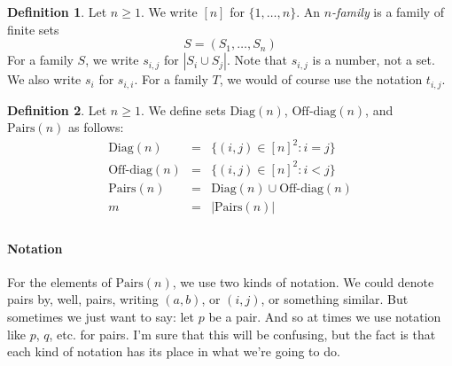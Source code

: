\documentclass[12pt]{article}
\theoremstyle{definition}
\newtheorem{definition}{Definition}
\newcommand{\set}[1]{\{ #1 \}}
\begin{document}
\newcommand{\Diag}{\mbox{Diag}}
\newcommand{\OffDiag}{\mbox{Off-diag}}
\newcommand{\Pairs}{\mbox{Pairs}}
\newcommand{\Bad}{\mbox{Bad}}
\newcommand{\argmax}{\mbox{argmax}}
\newcommand{\Clamp}{\mbox{Clamp}}
\newcommand{\sClamp}{\mbox{subset-Clamp}}
\newcommand{\ordercanonical}{<_{\scriptstyle can}}
\newcommand{\lex}{\ordercanonical}
\newcommand{\lexcanonical}{\ordercanonical}
\newcommand{\precsubseteq}{\preceq_{\scriptsize subset}}
\newcommand{\approxsubset}{\approx_{\scriptsize subset}}


\begin{definition}
Let $n\geq 1$.   We write $[n]$ for $\set{1,\ldots, n}$.
An \emph{$n$-family} is  a family of  finite sets
\[ S = (S_1, \ldots, S_n)\]
For a family $S$, we write $s_{i,j}$
for $|S_i\cup S_j|$.  Note that $s_{i,j}$
is a number, not a set.
We also write $s_i$ for $s_{i,i}$.
For a family $T$, we would of course use the notation $t_{i,j}$.
\end{definition}

\begin{definition}
Let $n\geq 1$.
We define  sets $\Diag(n)$, $\OffDiag(n)$, and $\Pairs(n)$ as follows:
\[
\begin{array}{lcl}
\Diag(n) & = & \set{(i,j)\in [n]^2:  i = j}\\
\OffDiag(n) & = & \set{(i,j)\in [n]^2:  i < j}\\
\Pairs(n) & = & \Diag(n)\cup\OffDiag(n)\\
m  & = & |\Pairs(n)|\\
\end{array}
\]
\end{definition}

\paragraph{Notation}
For the elements of $\Pairs(n)$, we use two kinds of notation.
We could denote pairs by, well, pairs, writing $(a,b)$, or $(i,j)$, or something similar.
But sometimes we just want to say: let $p$ be a pair.  And so at times we
use notation like $p$, $q$, etc. for pairs.
I'm sure that this will be confusing, but the fact is that each
kind of notation has its place in what we're going to do.
\end{document}
